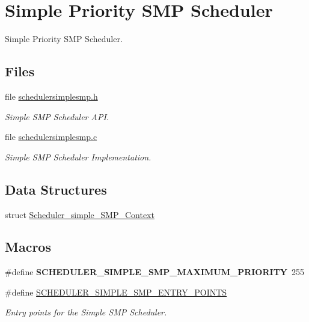 \hypertarget{group__RTEMSScoreSchedulerSMPSimple}{}\section{Simple Priority S\+MP Scheduler}
\label{group__RTEMSScoreSchedulerSMPSimple}


Simple Priority S\+MP Scheduler.  


\subsection*{Files}
\begin{DoxyCompactItemize}
\item 
file \mbox{\hyperlink{schedulersimplesmp_8h}{schedulersimplesmp.\+h}}
\begin{DoxyCompactList}\small\item\em Simple S\+MP Scheduler A\+PI. \end{DoxyCompactList}\item 
file \mbox{\hyperlink{schedulersimplesmp_8c}{schedulersimplesmp.\+c}}
\begin{DoxyCompactList}\small\item\em Simple S\+MP Scheduler Implementation. \end{DoxyCompactList}\end{DoxyCompactItemize}
\subsection*{Data Structures}
\begin{DoxyCompactItemize}
\item 
struct \mbox{\hyperlink{structScheduler__simple__SMP__Context}{Scheduler\+\_\+simple\+\_\+\+S\+M\+P\+\_\+\+Context}}
\end{DoxyCompactItemize}
\subsection*{Macros}
\begin{DoxyCompactItemize}
\item 
\mbox{\label{group__RTEMSScoreSchedulerSMPSimple_ga0cacf10ef27f56ed19b29a0baf6f4521}} 
\#define {\bfseries S\+C\+H\+E\+D\+U\+L\+E\+R\+\_\+\+S\+I\+M\+P\+L\+E\+\_\+\+S\+M\+P\+\_\+\+M\+A\+X\+I\+M\+U\+M\+\_\+\+P\+R\+I\+O\+R\+I\+TY}~255
\item 
\#define \mbox{\hyperlink{group__RTEMSScoreSchedulerSMPSimple_ga7857a6889ce42baaf371d85e01fcb692}{S\+C\+H\+E\+D\+U\+L\+E\+R\+\_\+\+S\+I\+M\+P\+L\+E\+\_\+\+S\+M\+P\+\_\+\+E\+N\+T\+R\+Y\+\_\+\+P\+O\+I\+N\+TS}}
\begin{DoxyCompactList}\small\item\em Entry points for the Simple S\+MP Scheduler. \end{DoxyCompactList}\end{DoxyCompactItemize}
